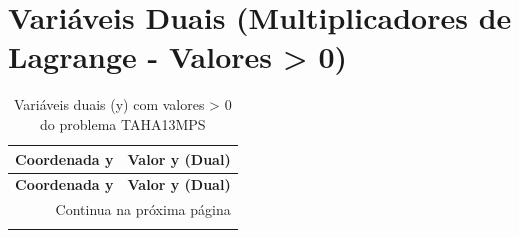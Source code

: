 \documentclass[12pt]{article}
\begin{document}
\section{Variáveis Duais (Multiplicadores de Lagrange - Valores > 0)}

\begin{longtable}{@{}cc@{}}
\caption{Variáveis duais (y) com valores > 0 do problema TAHA13MPS} \\
\toprule
\textbf{Coordenada y} & \textbf{Valor y (Dual)} \\
\midrule
\endfirsthead

\toprule
\textbf{Coordenada y} & \textbf{Valor y (Dual)} \\
\midrule
\endhead

\midrule \multicolumn{2}{r}{{Continua na próxima página}} \\ \midrule
\endfoot

\bottomrule
\endlastfoot

\bottomrule
\end{longtable}
\end{document}
